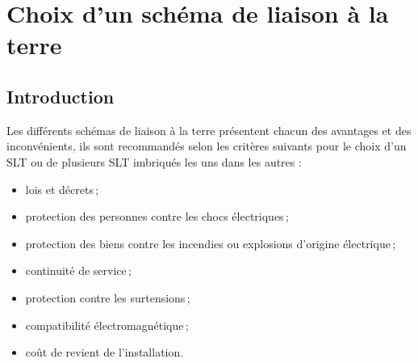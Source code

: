 

\begin{comment}

\documentclass[a4paper, 11pt, twoside, fleqn]{memoir}

\usepackage{AOCDTF}

\marqueurchapitre
\decoupagechapitre{1} %


	\openleft %

\end{comment}

\chapter{Choix d'un schéma de liaison à la terre}
\ChapFrame

\section{Introduction}

Les différents schémas de liaison à la terre présentent chacun des avantages et des inconvénients, ils sont recommandés selon les critères suivants pour le choix d'un SLT ou de plusieurs SLT imbriqués les uns dans les autres :

\begin{itemize}
\item lois et décrets\,;
\item protection des personnes contre les chocs électriques\,;
\item protection des biens contre les incendies ou explosions d'origine électrique\,;
\item continuité de service\,;
\item protection contre les surtensions\,;
\item compatibilité électromagnétique\,;
\item coût de revient de l'installation.
\end{itemize} 

